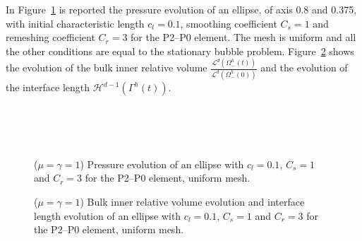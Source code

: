 \documentclass[a4paper,12pt,onecolumn]{article}
\begin{document}
In Figure~\ref{fig:ellipse} is reported the pressure evolution of an ellipse, of axis 0.8 and 0.375, with initial characteristic length $c_l=0.1$, smoothing coefficient $C_s=1$ and remeshing coefficient $C_r=3$ for the P2--P0 element. The mesh is uniform and all the other conditions are equal to the stationary bubble problem. Figure~\ref{fig:ellipse_volumes} shows the evolution of the bulk inner relative volume $\frac{\mathcal{L}^d(\Omega^h_-(t))}{\mathcal{L}^d(\Omega^h_-(0))}$ and the evolution of the interface length $\mathcal{H}^{d-1}(\Gamma^h(t))$.
\begin{figure}[htbp]
  \centering
  \\
  \quad
  \\
  \quad
  \\
  \caption{($\mu=\gamma=1$) Pressure evolution of an ellipse with $c_l=0.1$, $C_s=1$ and $C_r=3$ for the P2--P0 element, uniform mesh.}
  \label{fig:ellipse}
\end{figure}

\begin{figure}[htbp]
  \centering
  \caption{($\mu=\gamma=1$) Bulk inner relative volume evolution and interface length evolution of an ellipse with $c_l=0.1$, $C_s=1$ and $C_r=3$ for the P2--P0 element, uniform mesh.}
  \label{fig:ellipse_volumes}
\end{figure}
\end{document}
